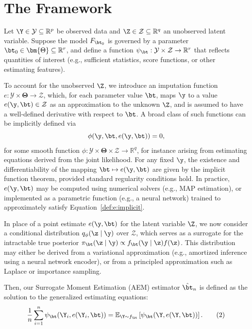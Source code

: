{\color{red}

\section{The Framework}

Let $\Y \in \mathcal{Y} \subseteq \mathbb{R}^p$ be observed data and $\Z \in \mathcal{Z} \subseteq \mathbb{R}^q$ an unobserved latent variable. Suppose the model $F_{\bt_0}$ is governed by a parameter $\bt_0 \in \bm{\Theta} \subseteq \mathbb{R}^r$, and define a function $\psi_\bt : \mathcal{Y} \times \mathcal{Z} \to \mathbb{R}^r$ that reflects quantities of interest (e.g., sufficient statistics, score functions, or other estimating features).


To account for the unobserved $\Z$, we introduce an imputation function \(e : \mathcal{Y} \times \bm{\Theta} \to \mathcal{Z}\),
which, for each parameter value $\bt$, maps $\y$ to a value \(e(\y, \bt) \in \mathcal{Z}\) as an approximation to the unknown $\Z$, and is assumed to have a well-defined derivative with respect to $\bt$. A broad class of such functions can be implicitly defined via
\begin{equation}
    \phi(\y, \bt, e(\y, \bt)) = 0,
\label{def:e:implicit}
\end{equation}
for some smooth function \(\phi : \mathcal{Y} \times \bm{\Theta} \times \mathcal{Z} \to \mathbb{R}^q\), for instance arising from estimating equations derived from the joint likelihood. For any fixed $\y$, the existence and differentiability of the mapping \(\bt \mapsto e(\y, \bt)\) are given by the implicit function theorem, provided standard regularity conditions hold. In practice, \(e(\y, \bt)\) may be computed using numerical solvers (e.g., MAP estimation), or implemented as a parametric function (e.g., a neural network) trained to approximately satisfy Equation~\eqref{def:e:implicit}.


In place of a point estimate \( e(\y, \bt) \) for the latent variable \( \Z \), we now consider a conditional distribution \( q_\phi(\z \mid \y) \) over \( \mathcal{Z} \), which serves as a surrogate for the intractable true posterior \( \pi_\bt(\z \mid \y) \propto f_\bt(\y \mid \z)f(\z) \). This distribution may either be derived from a variational approximation (e.g., amortized inference using a neural network encoder), or from a principled approximation such as Laplace or importance sampling.



Then, our Surrogate Moment Estimation (AEM) estimator $\hat\bt_n$ is defined as the solution to the generalized estimating equations:
\begin{equation}
\frac{1}{n} \sum_{i=1}^n \psi_\bt(\Y_i, e(\Y_i, \bt)) 
= 
\mathbb{E}_{\Y \sim f_\bt} 
\left[ 
\psi_\bt(\Y, e(\Y, \bt)) 
\right].
\tag{2}
\end{equation}



}
